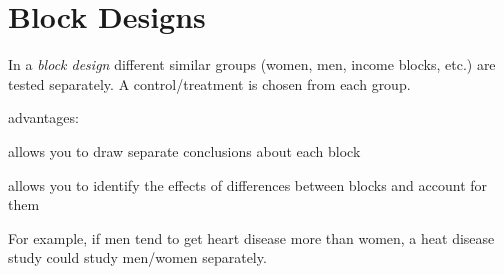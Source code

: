 \documentclass[landscape]{exam}
\begin{document}
  \section{Block Designs}
    In a {\em block design} different similar groups (women, men, income blocks,
    etc.) are tested separately.  A control/treatment is chosen from each group.  

    advantages:
    \begin{itemize*}
      \item allows you to draw separate conclusions about each block
      \item allows you to identify the effects of differences between blocks and
        account for them
    \end{itemize*}

    For example, if men tend to get heart disease more than women, a heat
    disease study could study men/women separately.
\end{document}
